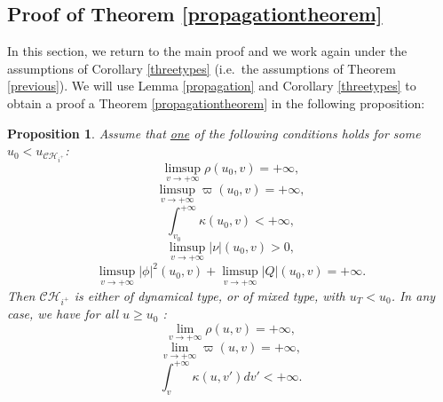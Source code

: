 \documentclass[10pt,a4paper]{article}
\theoremstyle{plain}
\newtheorem{prop}[thm]{Proposition}
\theoremstyle{remark}
\theoremstyle{definition}
\theoremstyle{plain}
\theoremstyle{remark}
\theoremstyle{definition}
\newcommand{\CH}{\mathcal{CH}_{i^+}}
\numberwithin{equation}{section}
\begin{document}
\subsection{Proof of Theorem \ref{propagationtheorem}} \label{blowupcriterion}

In this section, we return to the main proof and we work again under the assumptions of Corollary \ref{threetypes} (i.e.\ the assumptions of Theorem \ref{previous}). We will use Lemma \ref{propagation} and Corollary \ref{threetypes} to obtain a proof a Theorem \ref{propagationtheorem} in the following proposition:

\begin{prop} \label{propprop}
	Assume that \underline{one} of the following conditions holds for some $u_0 <u_{\CH}$: \begin{equation} \label{condition1}
	\limsup_{v \rightarrow+\infty} \rho(u_0,v)=+\infty,
	\end{equation}  \begin{equation} \label{condition2}
	\limsup_{v \rightarrow+\infty} \varpi(u_0,v)=+\infty,
	\end{equation} \begin{equation} \label{condition3}
	\int_{v_0}^{+\infty} \kappa(u_0,v) <+\infty,
	\end{equation} \begin{equation} \label{condition4}
	\limsup_{v \rightarrow+\infty} |\nu|(u_0,v) >0,
	\end{equation}\begin{equation} \label{condition5}
	\limsup_{v \rightarrow+\infty} |\phi|^2(u_0,v)+ \limsup_{v \rightarrow+\infty} |Q|(u_0,v)=+\infty.
	\end{equation}
	Then $\CH$ is either of dynamical type, or of mixed type, with $u_T<u_0$. In any case, we have for all $u \geq u_0$ : \begin{equation} \label{result1}
	\lim_{v \rightarrow+\infty} \rho(u,v)=+\infty,
	\end{equation}  \begin{equation} \label{result2}
	\lim_{v \rightarrow+\infty} \varpi(u,v)=+\infty,
	\end{equation} \begin{equation} \label{result3}
	\int_v^{+\infty} \kappa(u,v')dv'<+\infty.
	\end{equation} 
\end{prop}
\end{document}
